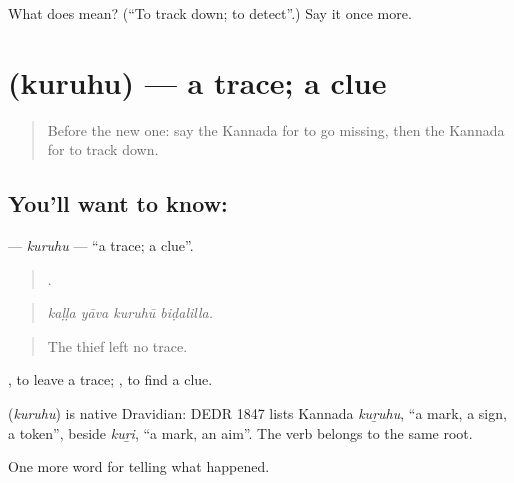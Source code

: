 \begin{tcolorbox}[breakable,colback=teal!4,colframe=teal!35!black,title={Before you move on}]
What does   mean? (\textquotedblleft{}To track down; to detect\textquotedblright{}.) Say it once more.
\end{tcolorbox}
\section[\texorpdfstring{\kn{ಕುರುಹು} (kuruhu)}{ಕುರುಹು (kuruhu)}]{ (kuruhu) — a trace; a clue}

\label{lesson:KA-C326-kuruhu}



\begin{quote}
Before the new one: say the Kannada for to go missing, then the Kannada for to track down.
\end{quote}

\subsection*{You'll want to know: }
\textbf{} — \emph{kuruhu} — \textquotedblleft{}a trace; a clue\textquotedblright{}.

\begin{quote}
   .
\end{quote}

\begin{quote}
\emph{kaḷḷa yāva kuruhū biḍalilla.}
\end{quote}

\begin{quote}
The thief left no trace.
\end{quote}

 , to leave a trace;  , to find a clue.

\begin{cousinweb}
\textbf{} (\emph{kuruhu}) is native Dravidian: DEDR 1847 lists Kannada \emph{kuṟuhu}, \textquotedblleft{}a mark, a sign, a token\textquotedblright{}, beside \emph{kuṟi}, \textquotedblleft{}a mark, an aim\textquotedblright{}. The verb  belongs to the same root.
\end{cousinweb}

\begin{grammarlens}[title={What you've built}]
One more word for telling what happened.
\end{grammarlens}

